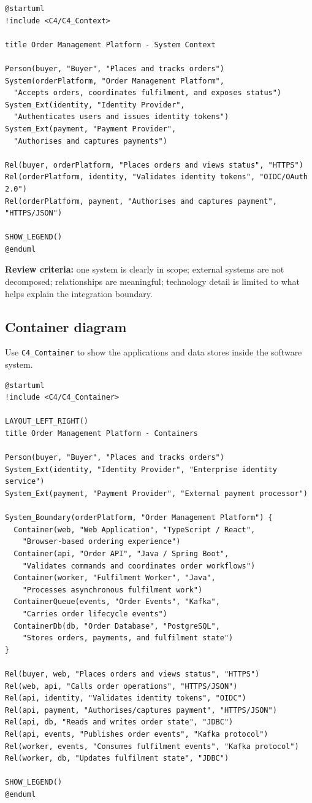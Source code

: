 \documentclass[11pt]{article}
\newcommand{\code}[1]{\texttt{#1}}
\begin{document}
\begin{lstlisting}[language=PlantUML]
@startuml
!include <C4/C4_Context>

title Order Management Platform - System Context

Person(buyer, "Buyer", "Places and tracks orders")
System(orderPlatform, "Order Management Platform",
  "Accepts orders, coordinates fulfilment, and exposes status")
System_Ext(identity, "Identity Provider",
  "Authenticates users and issues identity tokens")
System_Ext(payment, "Payment Provider",
  "Authorises and captures payments")

Rel(buyer, orderPlatform, "Places orders and views status", "HTTPS")
Rel(orderPlatform, identity, "Validates identity tokens", "OIDC/OAuth 2.0")
Rel(orderPlatform, payment, "Authorises and captures payment", "HTTPS/JSON")

SHOW_LEGEND()
@enduml
\end{lstlisting}

\textbf{Review criteria:} one system is clearly in scope; external systems are not decomposed; relationships are meaningful; technology detail is limited to what helps explain the integration boundary.

\subsection{Container diagram}

Use \code{C4\_Container} to show the applications and data stores inside the software system.

\begin{lstlisting}[language=PlantUML]
@startuml
!include <C4/C4_Container>

LAYOUT_LEFT_RIGHT()
title Order Management Platform - Containers

Person(buyer, "Buyer", "Places and tracks orders")
System_Ext(identity, "Identity Provider", "Enterprise identity service")
System_Ext(payment, "Payment Provider", "External payment processor")

System_Boundary(orderPlatform, "Order Management Platform") {
  Container(web, "Web Application", "TypeScript / React",
    "Browser-based ordering experience")
  Container(api, "Order API", "Java / Spring Boot",
    "Validates commands and coordinates order workflows")
  Container(worker, "Fulfilment Worker", "Java",
    "Processes asynchronous fulfilment work")
  ContainerQueue(events, "Order Events", "Kafka",
    "Carries order lifecycle events")
  ContainerDb(db, "Order Database", "PostgreSQL",
    "Stores orders, payments, and fulfilment state")
}

Rel(buyer, web, "Places orders and views status", "HTTPS")
Rel(web, api, "Calls order operations", "HTTPS/JSON")
Rel(api, identity, "Validates identity tokens", "OIDC")
Rel(api, payment, "Authorises/captures payment", "HTTPS/JSON")
Rel(api, db, "Reads and writes order state", "JDBC")
Rel(api, events, "Publishes order events", "Kafka protocol")
Rel(worker, events, "Consumes fulfilment events", "Kafka protocol")
Rel(worker, db, "Updates fulfilment state", "JDBC")

SHOW_LEGEND()
@enduml
\end{lstlisting}
\end{document}
